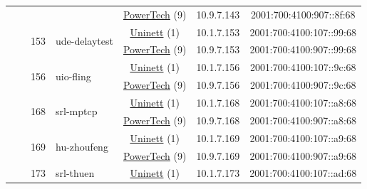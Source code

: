 \begin{small}
\begin{center}
\begin{longtable}{|c|c|c|c|c|c|c|c|}
  &  &  &  & \multicolumn{2}{|c|}{\tiny{\href{http://www.powertech.no}{PowerTech} (9)}} & \tiny{10.9.7.143} & \tiny{2001:700:4100:907::8f:68} \\* \cline{3-3}\cline{4-4}\cline{5-5}\cline{6-6}\cline{7-7}\cline{8-8}
  &  & \multirow{2}{*}{\tiny{153}} & \multicolumn{1}{|l|}{\multirow{2}{*}{\tiny{ude-delaytest}}} & \multicolumn{2}{|c|}{\tiny{\href{https://www.uninett.no}{Uninett} (1)}} & \tiny{10.1.7.153} & \tiny{2001:700:4100:107::99:68} \\* \cline{5-5}\cline{6-6}\cline{7-7}\cline{8-8}
  &  &  &  & \multicolumn{2}{|c|}{\tiny{\href{http://www.powertech.no}{PowerTech} (9)}} & \tiny{10.9.7.153} & \tiny{2001:700:4100:907::99:68} \\* \cline{3-3}\cline{4-4}\cline{5-5}\cline{6-6}\cline{7-7}\cline{8-8}
  &  & \multirow{2}{*}{\tiny{156}} & \multicolumn{1}{|l|}{\multirow{2}{*}{\tiny{uio-fling}}} & \multicolumn{2}{|c|}{\tiny{\href{https://www.uninett.no}{Uninett} (1)}} & \tiny{10.1.7.156} & \tiny{2001:700:4100:107::9c:68} \\* \cline{5-5}\cline{6-6}\cline{7-7}\cline{8-8}
  &  &  &  & \multicolumn{2}{|c|}{\tiny{\href{http://www.powertech.no}{PowerTech} (9)}} & \tiny{10.9.7.156} & \tiny{2001:700:4100:907::9c:68} \\* \cline{3-3}\cline{4-4}\cline{5-5}\cline{6-6}\cline{7-7}\cline{8-8}
  &  & \multirow{2}{*}{\tiny{168}} & \multicolumn{1}{|l|}{\multirow{2}{*}{\tiny{srl-mptcp}}} & \multicolumn{2}{|c|}{\tiny{\href{https://www.uninett.no}{Uninett} (1)}} & \tiny{10.1.7.168} & \tiny{2001:700:4100:107::a8:68} \\* \cline{5-5}\cline{6-6}\cline{7-7}\cline{8-8}
  &  &  &  & \multicolumn{2}{|c|}{\tiny{\href{http://www.powertech.no}{PowerTech} (9)}} & \tiny{10.9.7.168} & \tiny{2001:700:4100:907::a8:68} \\* \cline{3-3}\cline{4-4}\cline{5-5}\cline{6-6}\cline{7-7}\cline{8-8}
  &  & \multirow{2}{*}{\tiny{169}} & \multicolumn{1}{|l|}{\multirow{2}{*}{\tiny{hu-zhoufeng}}} & \multicolumn{2}{|c|}{\tiny{\href{https://www.uninett.no}{Uninett} (1)}} & \tiny{10.1.7.169} & \tiny{2001:700:4100:107::a9:68} \\* \cline{5-5}\cline{6-6}\cline{7-7}\cline{8-8}
  &  &  &  & \multicolumn{2}{|c|}{\tiny{\href{http://www.powertech.no}{PowerTech} (9)}} & \tiny{10.9.7.169} & \tiny{2001:700:4100:907::a9:68} \\* \cline{3-3}\cline{4-4}\cline{5-5}\cline{6-6}\cline{7-7}\cline{8-8}
  &  & \multirow{2}{*}{\tiny{173}} & \multicolumn{1}{|l|}{\multirow{2}{*}{\tiny{srl-thuen}}} & \multicolumn{2}{|c|}{\tiny{\href{https://www.uninett.no}{Uninett} (1)}} & \tiny{10.1.7.173} & \tiny{2001:700:4100:107::ad:68} \\* \cline{5-5}\cline{6-6}\cline{7-7}\cline{8-8}

\end{longtable}
\end{center}
\end{small}
